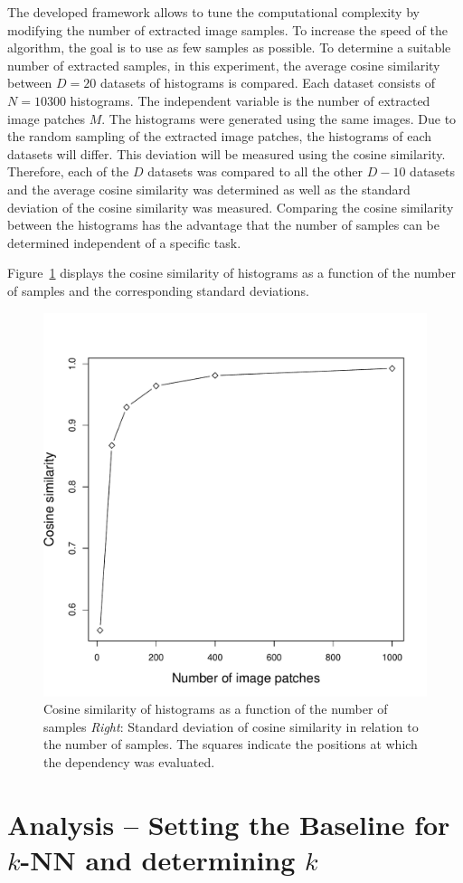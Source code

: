 \documentclass{report}
\begin{document}
The developed framework allows to tune the computational complexity by
modifying the number of extracted image samples. To increase the speed
of the algorithm, the goal is to use as few samples as possible. To
determine a suitable number of extracted samples, in this experiment,
the average cosine similarity between $D = 20$ datasets of histograms
is compared. Each dataset consists of $N = 10300$ histograms. The
independent variable is the number of extracted image patches $M$. The
histograms were generated using the same images. Due to the random
sampling of the extracted image patches, the histograms of each
datasets will differ. This deviation will be measured using the cosine
similarity. Therefore, each of the $D$ datasets was compared to all
the other $D - 10$ datasets and the average cosine similarity was
determined as well as the standard deviation of the cosine similarity
was measured. Comparing the cosine similarity between the histograms
has the advantage that the number of samples can be determined
independent of a specific task.


Figure~\ref{fig:cosine} displays the cosine similarity of histograms
as a function of the number of samples and the corresponding standard
deviations.

\begin{figure}[h!]
\begin{center}
\includegraphics[width=0.336\columnwidth]{samples_vs_similarity}
\caption{{\label{fig:cosine} Cosine similarity of histograms as a
    function of the number of samples \emph{Right}: Standard deviation
    of cosine similarity in relation to the number of samples. The
    squares indicate the positions at which the dependency was
    evaluated.%
  }}
\end{center}
\end{figure}


\section{Analysis -- Setting the Baseline for $k$-NN and determining
  $k$}
\label{sec:detk}
\end{document}
